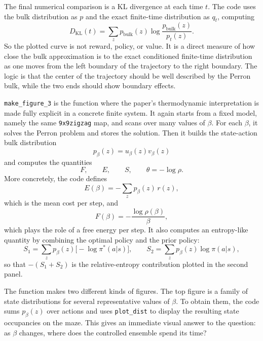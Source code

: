 \documentclass[11pt]{article}
\begin{document}
The final numerical comparison is a KL divergence at each time \(t\). The code uses the bulk
distribution as \(p\) and the exact finite-time distribution as \(q_t\), computing
\begin{equation}
    D_{\mathrm{KL}}(t)
    =
    \sum_z p_{\mathrm{bulk}}(z)\log \frac{p_{\mathrm{bulk}}(z)}{p_t(z)}.
\end{equation}
So the plotted curve is not reward, policy, or value. It is a direct measure of how close the
bulk approximation is to the exact conditioned finite-time distribution as one moves from the
left boundary of the trajectory to the right boundary. The logic is that the center of the
trajectory should be well described by the Perron bulk, while the two ends should show
boundary effects.

\medskip
\texttt{make\_figure\_3} is the function where the paper's thermodynamic interpretation is made
fully explicit in a concrete finite system. It again starts from a fixed model, namely the same
\texttt{9x9zigzag} map,
and scans over many values of \(\beta\). For each \(\beta\), it solves the Perron problem and
stores the solution. Then it builds the state-action bulk distribution
\begin{equation}
    p_\beta(z)=u_\beta(z)v_\beta(z)
\end{equation}
and computes the quantities
\begin{equation}
    F,\qquad E,\qquad S,\qquad \theta=-\log\rho.
\end{equation}
More concretely, the code defines
\begin{equation}
    E(\beta) = -\sum_z p_\beta(z)\,r(z),
\end{equation}
which is the mean cost per step, and
\begin{equation}
    F(\beta) = -\frac{\log \rho(\beta)}{\beta},
\end{equation}
which plays the role of a free energy per step. It also computes an entropy-like quantity by
combining the optimal policy and the prior policy:
\begin{equation}
    S_1 = \sum_z p_\beta(z)\bigl[-\log \pi^*(a|s)\bigr],
    \qquad
    S_2 = \sum_z p_\beta(z)\log \pi(a|s),
\end{equation}
so that \(-(S_1+S_2)\) is the relative-entropy contribution plotted in the second panel.

The function makes two different kinds of figures. The top figure is a family of state
distributions for several representative values of \(\beta\). To obtain them, the code sums
\(p_\beta(z)\) over actions and uses \texttt{plot\_dist} to display the resulting state
occupancies on the maze. This gives an immediate visual answer to the question: as \(\beta\)
changes, where does the controlled ensemble spend its time?
\end{document}
